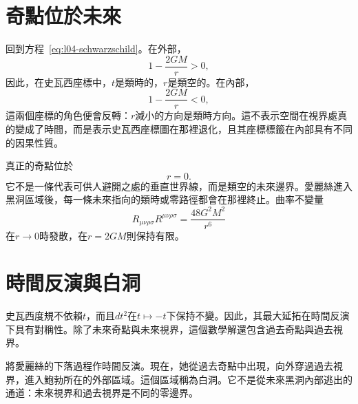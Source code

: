 \section{奇點位於未來}

回到方程~\eqref{eq:l04-schwarzschild}。在外部，
\begin{equation}
1-\frac{2GM}{r}>0,
\end{equation}
因此，在史瓦西座標中，\(t\)是類時的，\(r\)是類空的。在內部，
\begin{equation}
1-\frac{2GM}{r}<0,
\end{equation}
這兩個座標的角色便會反轉：\(r\)減小的方向是類時方向。這不表示空間在視界處真的變成了時間，而是表示史瓦西座標圖在那裡退化，且其座標標籤在內部具有不同的因果性質。

真正的奇點位於
\begin{equation}
r=0.
\end{equation}
它不是一條代表可供人避開之處的垂直世界線，而是類空的未來邊界。愛麗絲進入黑洞區域後，每一條未來指向的類時或零路徑都會在那裡終止。曲率不變量
\begin{equation}
R_{\mu\nu\rho\sigma}R^{\mu\nu\rho\sigma}
=\frac{48G^2M^2}{r^6}
\label{eq:l04-kretschmann}
\end{equation}
在\(r\to0\)時發散，在\(r=2GM\)則保持有限。

\section{時間反演與白洞}

史瓦西度規不依賴\(t\)，而且\(dt^2\)在\(t\mapsto-t\)下保持不變。因此，其最大延拓在時間反演下具有對稱性。除了未來奇點與未來視界，這個數學解還包含過去奇點與過去視界。

將愛麗絲的下落過程作時間反演。現在，她從過去奇點中出現，向外穿過過去視界，進入鮑勃所在的外部區域。這個區域稱為白洞。它不是從未來黑洞內部逃出的通道：未來視界和過去視界是不同的零邊界。

\begin{classroomqa}
\end{classroomqa}

\begin{classroomqa}
\end{classroomqa}

